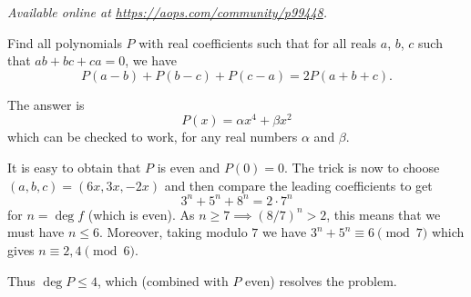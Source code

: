 \textsl{Available online at \url{https://aops.com/community/p99448}.}
\begin{mdframed}[style=mdpurplebox,frametitle={Problem statement}]
Find all polynomials $P$ with real coefficients such that
for all reals $a$, $b$, $c$ such that $ab+bc+ca = 0$, we have
\[ P(a-b) + P(b-c) + P(c-a) = 2P(a+b+c). \]
\end{mdframed}
The answer is \[ P(x) = \alpha x^4 + \beta x^2 \]
which can be checked to work, for any real numbers $\alpha$ and $\beta$.

It is easy to obtain that $P$ is even and $P(0) = 0$.
The trick is now to choose $(a,b,c) = (6x,3x,-2x)$
and then compare the leading coefficients to get
\[ 3^n + 5^n + 8^n = 2 \cdot 7^n \]
for $n = \deg f$ (which is even).
As $n \ge 7 \implies (8/7)^n > 2$, this means that we must have $n \le 6$.
Moreover, taking modulo $7$ we have $3^n + 5^n \equiv 6 \pmod 7$
which gives $n \equiv 2, 4 \pmod 6$.

Thus $\deg P \le 4$, which (combined with $P$ even) resolves the problem.
\pagebreak